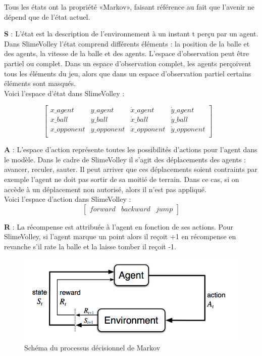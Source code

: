 \documentclass[11pt, a4paper]{article}
\begin{document}
	\vspace{0.5cm}

	\noindent Tous les états ont la propriété «Markov», faisant référence au fait que l'avenir ne dépend que de l'état actuel.

	\noindent \textbf{S} : L'état est la description de l'environnement à un instant t perçu par un agent. \\
	Dans SlimeVolley l'état comprend différents éléments : la position de la balle et des agents, la vitesse de la balle et des agents. L'espace d'observation peut être partiel ou complet. Dans un espace d'observation complet, les agents perçoivent tous les éléments du jeu, alors que dans un espace d'observation partiel certains éléments sont masqués. \\
	Voici l'espace d'état dans SlimeVolley :

	$$
	\begin{bmatrix}
		x\_agent & y\_agent & \dot{x} \_agent & \dot{y}\_agent \\
		x\_ball & y\_ball & \dot{x}\_ball & \dot{y}\_ball \\
		x\_opponent & y\_opponent & \dot{x}\_opponent & \dot{y}\_opponent \\
	\end{bmatrix}
	\label{tab_state}
	\quad
	$$


	\noindent \textbf{A} : L'espace d'action représente toutes les possibilités d'actions pour l'agent dans le modèle. Dans le cadre de SlimeVolley il s'agit des déplacements des agents : avancer, reculer, sauter.
	Il peut arriver que ces déplacements soient contraints par exemple l'agent ne doit pas sortir de sa moitié de terrain. Dans ce cas, si on accède à un déplacement non autorisé, alors il n'est pas appliqué.\\
	Voici l'espace d'action dans SlimeVolley :
	$$
	\begin{bmatrix}
		forward & backward & jump
	\end{bmatrix}
	$$

	\noindent \textbf{R} : La récompense est attribuée à l'agent en fonction de ses actions. Pour SlimeVolley, si l'agent marque un point alors il reçoit +1 en récompense en revanche s'il rate la balle et la laisse tomber il reçoit -1.

	\begin{figure}[H]
		\centering
		\includegraphics[scale=0.5]{images/agent_environment_MDP.png}
		\caption {Schéma du processus décisionnel de Markov \cite{schemamarkov}}
	\end{figure}
\end{document}
